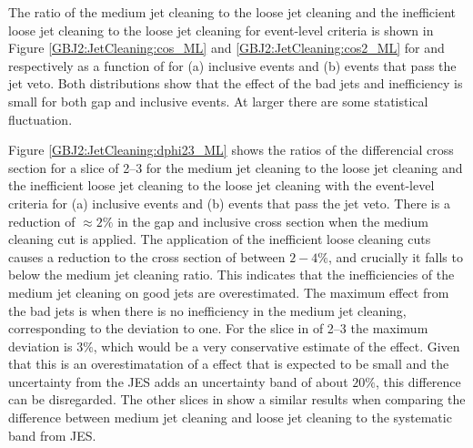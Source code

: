 
The ratio of the medium jet cleaning to the loose jet cleaning and the inefficient loose jet cleaning to the loose jet cleaning for event-level criteria is shown in Figure \ref{GBJ2:JetCleaning:cos_ML} and \ref{GBJ2:JetCleaning:cos2_ML} for \mean{\cosdphi{}} and \mean{\costwodphi{}} respectively as a function of \dy{} for (a) inclusive events and (b) events that pass the jet veto. 
Both distributions show that the effect of the bad jets and inefficiency is small for both gap and inclusive events.
At larger \dy{} there are some statistical fluctuation.

Figure \ref{GBJ2:JetCleaning:dphi23_ML} shows the ratios of the differencial cross section for  a \dy{} slice of  2--3  for the medium jet cleaning to the loose jet cleaning and the inefficient loose jet cleaning to the loose jet cleaning with the event-level criteria for (a) inclusive events and (b) events that pass the jet veto.
There is a reduction of $\approx 2\%$ in the gap and inclusive cross section when the medium cleaning cut is applied.
The application of the inefficient loose cleaning cuts causes a reduction to the cross section of between $2-4\%$, and crucially it falls to below the medium jet cleaning ratio. 
This indicates that the inefficiencies of the medium jet cleaning on good jets are overestimated.
The maximum effect from the bad jets is when there is no inefficiency in the medium jet cleaning, corresponding to the deviation to one. 
For the slice in \dy{} of 2--3 the maximum deviation is $3\%$, which would be a very conservative estimate of the effect.
Given that this is an overestimatation of a effect that is expected to be small and the uncertainty from the JES adds an uncertainty band of about $20\%$, this difference can be disregarded. 
The other slices in \dy{} show a similar results when comparing the difference between medium jet cleaning and loose jet cleaning to the systematic band from JES.


